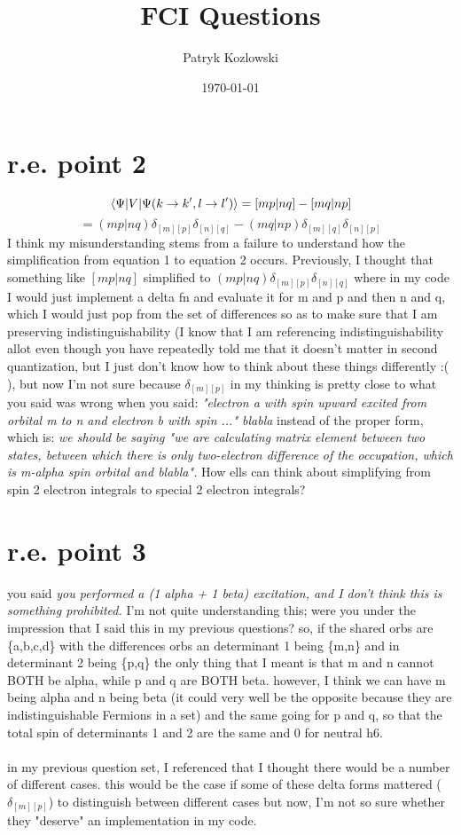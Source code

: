 \documentclass[12pt]{article}
\title{FCI Questions}
\author{Patryk Kozlowski}
\date{\today}
\begin{document}
\maketitle
\section{r.e. point 2}
\begin{equation}
    \mel{\Psi }{V}{\Psi (k\rightarrow k^{\prime}, l\rightarrow l^{\prime})}
    =[mp|nq]-[mq|np]
\end{equation}
\begin{equation}
    =(mp|nq)\delta _{[m][p]}\delta _{[n][q]}-(mq|np)\delta _{[m][q]}\delta _{[n][p]}
\end{equation}
I think my misunderstanding stems from a failure to understand how the simplification from equation 1 to equation 2 occurs. Previously, I thought that something like $[mp|nq]$ simplified to $(mp|nq)\delta _{[m][p]}\delta _{[n][q]}$ where in my code I would just implement a delta fn and evaluate it for m and p and then n and q, which I would just pop from the set of differences so as to make sure that I am preserving indistinguishability (I know that I am referencing indistinguishability allot even though you have repeatedly told me that it doesn't matter in second quantization, but I just don't know how to think about these things differently :(  ), but now I'm not sure because $\delta _{[m][p]}$ in my thinking is pretty close to what you said was wrong when you said: \emph{"electron a with spin upward excited from orbital m to n and electron b with spin ..." blabla} instead of the proper form, which is: \emph{we should be saying "we are calculating matrix element between two states, between which there is only two-electron difference of the occupation, which is m-alpha spin orbital and blabla".} How ells can think about simplifying from spin 2 electron integrals to special 2 electron integrals?
\section{r.e. point 3}
you said \emph{ you performed a (1 alpha + 1 beta) excitation, and I don't think this is something prohibited.} I'm not quite understanding this; were you under the impression that I said this in my previous questions? so, if the shared orbs are \{a,b,c,d\} with the differences orbs an determinant 1 being \{m,n\} and in determinant 2 being \{p,q\} the only thing that I meant is that m and n cannot BOTH be alpha, while p and q are BOTH beta. however, I think we can have m being alpha and n being beta (it could very well be the opposite because they are indistinguishable Fermions in a set) and the same going for p and q, so that the total spin of determinants 1 and 2 are the same and 0 for neutral h6.
\\\\in my previous question set, I referenced that I thought there would be a number of different cases. this would be the case if some of these delta forms mattered ($\delta _{[m][p]}$) to distinguish between different cases but now, I'm not so sure whether they "deserve" an implementation in my code.
 
\end{document}
